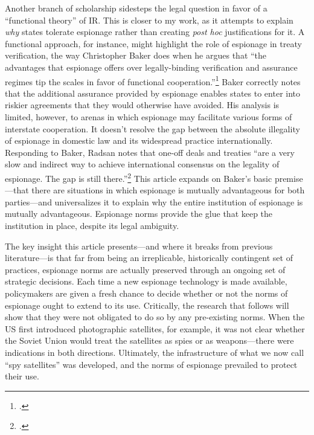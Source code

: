 \documentclass[14pt]{extarticle}
\begin{document}
Another branch of scholarship sidesteps the legal question in favor of a \enquote{functional theory} of IR. This is closer to my work, as it attempts to explain \emph{why} states tolerate espionage rather than creating \emph{post hoc} justifications for it. A functional approach, for instance, might highlight the role of espionage in treaty verification, the way Christopher Baker does when he argues that \enquote{the advantages that espionage offers over legally-binding verification and assurance regimes tip the scales in favor of functional cooperation.}\footcite{baker_tolerance_2004} Baker correctly notes that the additional assurance provided by espionage enables states to enter into riskier agreements that they would otherwise have avoided. His analysis is limited, however, to arenas in which espionage may facilitate various forms of interstate cooperation. It doesn't resolve the gap between the absolute illegality of espionage in domestic law and its widespread practice internationally. Responding to Baker, Radsan notes that one-off deals and treaties \enquote{are a very slow and indirect way to achieve international consensus on the legality of espionage. The gap is still there.}\footcite[p.~607]{radsan_unresolved_2007} This article expands on Baker's basic premise---that there are situations in which espionage is mutually advantageous for both parties---and universalizes it to explain why the entire institution of espionage is mutually advantageous. Espionage norms provide the glue that keep the institution in place, despite its legal ambiguity.

The key insight this article presents---and where it breaks from previous literature---is that far from being an irreplicable, historically contingent set of practices, espionage norms are actually preserved through an ongoing set of strategic decisions. Each time a new espionage technology is made available, policymakers are given a fresh chance to decide whether or not the norms of espionage ought to extend to its use. Critically, the research that follows will show that they were not obligated to do so by any pre-existing norms. When the US first introduced photographic satellites, for example, it was not clear whether the Soviet Union would treat the satellites as spies or as weapons---there were indications in both directions. Ultimately, the infrastructure of what we now call \enquote{spy satellites} was developed, and the norms of espionage prevailed to protect their use.
\end{document}

